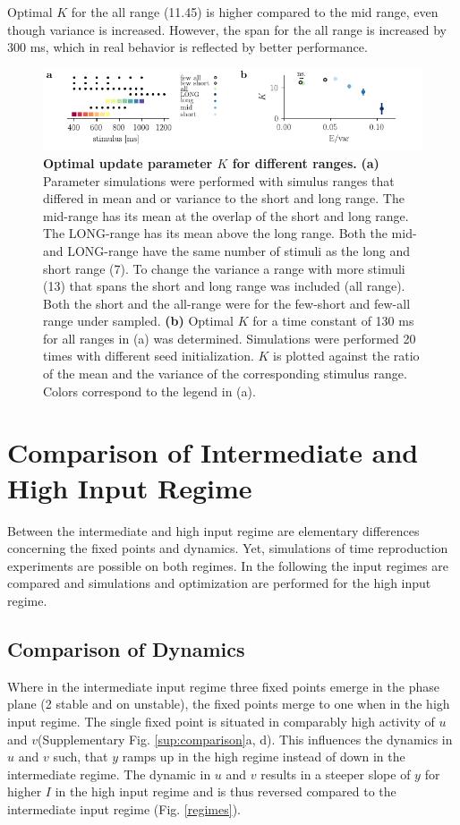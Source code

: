 \documentclass[10pt]{article}
\begin{document}
Optimal $K$ for the all range (11.45) is higher compared to the mid range, even though variance is increased. However, the span for the all range is increased by 300 ms, which in real behavior is reflected by better performance. 

\begin{figure}[ht]
	\centering
	\includegraphics{figures/ranges_new.pdf}
	\caption{\textbf{Optimal update parameter $K$ for different ranges.} 
	\textbf{(a)} Parameter simulations were performed with simulus ranges that differed in mean and or variance to the short and long range. The mid-range has its mean at the overlap of the short and long range. The LONG-range has its mean above the long range. Both the mid- and LONG-range have the same number of stimuli as the long and short range (7). To change the variance a range with more stimuli (13) that spans the short and long range was included (all range). Both the short and the all-range were for the few-short and few-all range under sampled.
	\textbf{(b)} Optimal $K$ for a time constant of 130 ms for all ranges in (a) was determined. Simulations were performed 20 times with different seed initialization. $K$ is plotted against the ratio of the mean and the variance of the corresponding stimulus range. Colors correspond to the legend in (a). 
	}
\label{fig:new_ranges}
\end{figure}

\section{Comparison of Intermediate and High Input Regime}
Between the intermediate and high input regime are elementary differences concerning the fixed points and dynamics. Yet, simulations of time reproduction experiments are possible on both regimes. In the following the input regimes are compared and simulations and optimization are performed for the high input regime.

\subsection{Comparison of Dynamics}
Where in the intermediate input regime three fixed points emerge in the phase plane (2 stable and on unstable), the fixed points merge to one when in the high input regime. 
The single fixed point is situated in comparably high activity of $u$ and $v$(Supplementary Fig. \ref{sup:comparison}a, d). 
This influences the dynamics in $u$ and $v$ such, that $y$ ramps up in the high regime instead of down in the intermediate regime. 
The dynamic in $u$ and $v$ results in a steeper slope of $y$ for higher $I$ in the high input regime and is thus reversed compared to the intermediate input regime (Fig. \ref{regimes}). 
\end{document}
